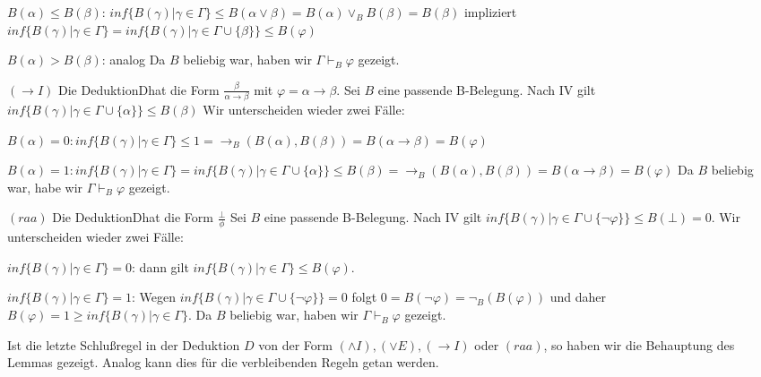 \documentclass[a4paper]{article}
\begin{document}
\begin{multicols}{3}
\begin{itemize*}
\begin{itemize*}
\begin{itemize*}
        \item $B(\alpha)\leq B(\beta)$:
        $inf\{B(\gamma)|\gamma\in\Gamma\}\leq B(\alpha\vee\beta) =B(\alpha)\vee_B B(\beta) =B(\beta)$ impliziert
        $inf\{B(\gamma)|\gamma\in\Gamma\}= inf\{B(\gamma)|\gamma\in\Gamma\cup\{\beta\}\}\leq B(\varphi)$
        \item $B(\alpha)>B(\beta)$: analog
        Da $B$ beliebig war, haben wir $\Gamma\vdash_B \varphi$ gezeigt.
      \end{itemize*}
      \item $(\rightarrow I)$ Die DeduktionDhat die Form $\frac{\beta}{\alpha\rightarrow\beta}$
      mit $\varphi=\alpha\rightarrow\beta$. Sei $B$ eine passende B-Belegung. Nach IV gilt
      $inf\{B(\gamma)|\gamma\in\Gamma\cup\{\alpha\}\}\leq B(\beta)$
      Wir unterscheiden wieder zwei Fälle:
      \begin{itemize*}
        \item $B(\alpha)=0:inf\{B(\gamma)|\gamma\in\Gamma\}\leq 1 =\rightarrow_B(B(\alpha),B(\beta)) = B(\alpha\rightarrow\beta) =B(\varphi)$
        \item $B(\alpha)=1:inf\{B(\gamma)|\gamma\in\Gamma\}=inf\{B(\gamma)|\gamma\in\Gamma\cup\{\alpha\}\}\leq B(\beta) =\rightarrow_B (B(\alpha),B(\beta)) = B(\alpha\rightarrow\beta) =B(\varphi)$
        Da $B$ beliebig war, habe wir $\Gamma\vdash_B \varphi$ gezeigt.
      \end{itemize*}
      \item $(raa)$ Die DeduktionDhat die Form $\frac{\bot}{\phi}$
      Sei $B$ eine passende B-Belegung. Nach IV gilt $inf\{B(\gamma)|\gamma\in\Gamma\cup\{\lnot\varphi\}\}\leq B(\bot) = 0$.
      Wir unterscheiden wieder zwei Fälle:
      \begin{itemize*}
        \item $inf\{B(\gamma)|\gamma\in\Gamma\}=0$: dann gilt $inf\{B(\gamma)|\gamma\in\Gamma\}\leq B(\varphi)$.
        \item $inf\{B(\gamma)|\gamma\in\Gamma\}=1$: Wegen $inf\{B(\gamma)|\gamma\in\Gamma\cup\{\lnot\varphi\}\}=0$ folgt $0 =B(\lnot\varphi)=\lnot_B (B(\varphi))$ und daher $B(\varphi)=1\geq inf\{B(\gamma)|\gamma\in\Gamma\}$.
        Da $B$ beliebig war, haben wir $\Gamma\vdash_B \varphi$ gezeigt.
      \end{itemize*}
    \end{itemize*}
  \end{itemize*}

  Ist die letzte Schlußregel in der Deduktion $D$ von der Form $(\wedge I), (\vee E), (\rightarrow I)$ oder $(raa)$, so haben wir die Behauptung des Lemmas gezeigt. Analog kann dies für die verbleibenden Regeln getan werden.


\end{multicols}
\end{document}
